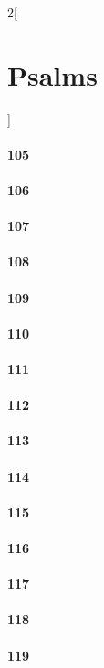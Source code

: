 \documentclass{book}
\begin{document}
\begin{multicols}{2}[\part{Psalms}]
\subsection*{105}
\subsection*{106}
\subsection*{107}
\subsection*{108}
\subsection*{109}
\subsection*{110}
\subsection*{111}
\subsection*{112}
\subsection*{113}
\subsection*{114}
\subsection*{115}
\subsection*{116}
\subsection*{117}
\subsection*{118}
\subsection*{119}

\end{multicols}
\end{document}
